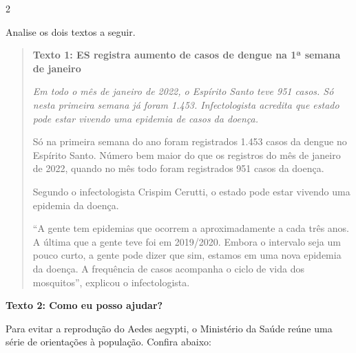 \num{2}

Analise os dois textos a seguir.

\begin{quote}

\textbf{Texto 1: ES registra aumento de casos de dengue na 1ª semana de janeiro}

\textit{Em todo o mês de janeiro de 2022, o Espírito Santo teve 951
casos. Só nesta primeira semana já foram 1.453. Infectologista acredita
que estado pode estar vivendo uma epidemia de casos da doença.}

Só na primeira semana do ano foram registrados 1.453 casos da dengue no
Espírito Santo. Número bem maior do que os registros do mês de janeiro
de 2022, quando no mês todo foram registrados 951 casos da doença.

Segundo o infectologista Crispim Cerutti, o estado pode estar vivendo
uma epidemia da doença.

``A gente tem epidemias que ocorrem a aproximadamente a cada três anos. A
última que a gente teve foi em 2019/2020. Embora o intervalo seja um
pouco curto, a gente pode dizer que sim, estamos em uma nova epidemia da
doença. A frequência de casos acompanha o ciclo de vida dos mosquitos'',
explicou o infectologista.

\end{quote}


\textbf{Texto 2: Como eu posso ajudar?}

Para evitar a reprodução do Aedes aegypti, o Ministério da Saúde reúne
uma série de orientações à população. Confira abaixo:


